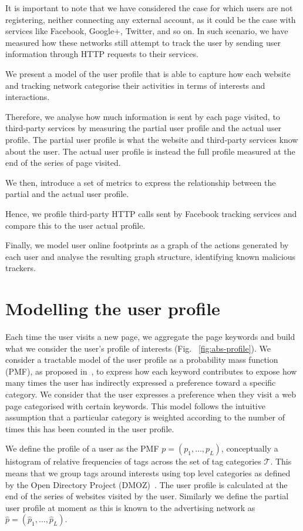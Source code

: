 It is important to note that we have considered the case for which users are not registering, neither connecting any external account, as it could be the case with services like Facebook, Google+, Twitter, and so on. In such scenario, we have measured how these networks still attempt to track the user by sending user information through HTTP requests to their services.

We present a model of the user profile that is able to capture how each website and tracking network categorise their activities in terms of interests and interactions.

Therefore, we analyse how much information is sent by each page visited, to third-party services by measuring the partial user profile and the actual user profile. The partial user profile is what the website and third-party services know about the user. The actual user profile is instead the full profile measured at the end of the series of page visited.

We then, introduce a set of metrics to express the relationship between the partial and the actual user profile.

Hence, we profile third-party HTTP calls sent by Facebook tracking services and compare this to the user actual profile.

Finally, we model user online footprints as a graph of the actions generated by each user and analyse the resulting graph structure, identifying known malicious trackers.

\section{Modelling the user profile}
\label{sec:mod-profile}
\noindent
Each time the user visits a new page, we aggregate the page keywords and build what we consider the user's profile of interests (Fig. ~\ref{fig:abs-profile}). We consider a tractable model of the user profile as a probability mass function (PMF), as proposed in~\cite{parra2012optimal,Parra12TKDE}, to express how each keyword contributes to expose how many times the user has indirectly expressed a preference toward a specific category. We consider that the user expresses a preference when they visit a web page categorised with certain keywords. This model follows the intuitive assumption that a particular category is weighted according to the number of times this has been counted in the user profile.

We define the profile of a user as the PMF $p = (p_1,\ldots, p_L)$, conceptually a histogram of relative frequencies of tags across the set of tag categories $\mathcal{T}$. This means that we group tags around interests using top level categories as defined by the Open Directory Project (DMOZ)~\cite{a22}.
The user profile is calculated at the end of the series of websites visited by the user. Similarly we define the partial user profile at moment as this is known to the advertising network as  $\hat{p} = (\hat{p}_1,\ldots, \hat{p}_L)$.

